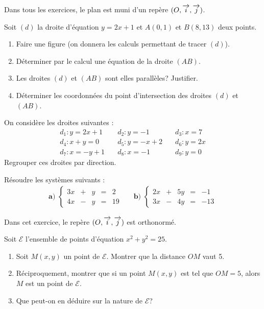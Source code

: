 \documentclass[a4paper,11pt,DIV10,BCOR0mm]{scrartcl}
\begin{document}

Dans tous les exercices, le plan est muni d'un repère $(O,\overrightarrow{i},\overrightarrow{j})$.
\begin{exercice}
 Soit $(d)$ la droite d'équation $y=2x+1$ et $A(0,1)$ et $B(8,13)$ deux points.
\begin{enumerate}
 \item Faire une figure (on donnera les calculs permettant de tracer $(d)$).
 \item Déterminer par le calcul une équation de la droite $(AB)$.
 \item Les droites $(d)$ et $(AB)$ sont elles parallèles? Justifier.
 \item Déterminer les coordonnées du point d'intersection des droites $(d)$ et $(AB)$.
\end{enumerate}

\end{exercice}

\begin{exercice}
 On considère les droites suivantes :
 \renewcommand{\arraystretch}{1.5}
 \[
 \begin{array}{lll}
 d_1 : y=2x+1	& \quad d_2 : y=-1	& \quad d_3 : x=7\\
 d_4 : x+y=0 	& \quad d_5 : y=-x+2	& \quad d_6 : y=2x\\
 d_7 : x=-y+1	& \quad d_8 : x=-1	& \quad d_9 : y=0
 \end{array}
 \]
 Regrouper ces droites par direction.
\end{exercice}

\begin{exercice}
 Résoudre les systèmes suivants :
\begin{align*}
\textbf{a) }
\left\{
   \begin{array}{ccccc}
      3x&+&y&=&2\\
		4x&-&y&=&19
   \end{array}
	\right.
&&\textbf{b) }
\left\{
   \begin{array}{ccccc}
      2x&+&5y&=&-1\\
		3x&-&4y&=&-13
   \end{array}
	\right.
\end{align*}
\end{exercice}

\begin{exercice}
Dans cet exercice, le repère $(O,\overrightarrow{i},\overrightarrow{j})$ est orthonormé.


Soit $\mathcal{E}$ l'ensemble de points d'équation $x^2+y^2=25$.
\begin{enumerate}
  \item Soit $M(x,y)$ un point de $\mathcal{E}$. Montrer que la distance
  $OM$ vaut 5.
  \item Réciproquement, montrer que si un point $M(x,y)$ est 
  tel que $OM=5$, alors $M$ est un point de $\mathcal{E}$.
  \item Que peut-on en déduire sur la nature de $\mathcal{E}$?
\end{enumerate}
\end{exercice}
\end{document}
